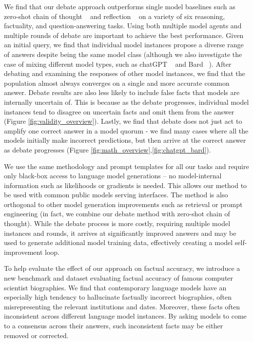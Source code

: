 We find that our debate approach outperforms single model baselines such as zero-shot chain of thought ~\cite{kojima2022large} and reflection ~\cite{reflexion,madaan2023self} on a variety of six reasoning, factuality, and question-answering tasks. Using both multiple model agents and multiple rounds of debate are important to achieve the best performance. Given an initial query, we find that individual model instances propose a diverse range of answers despite being the same model class (although we also investigate the case of mixing different model types, such as chatGPT ~\cite{chatgpt2022} and Bard ~\cite{Pichai_2023}). After debating and examining the responses of other model instances, we find that the population almost always converges on a single and more accurate common answer. Debate results are also less likely to include false facts that models are internally uncertain of. This is because as the debate progresses, individual model instances tend to disagree on uncertain facts and omit them from the answer (Figure \ref{fig:validity_overview}). Lastly, we find that debate does not just act to amplify one correct answer in a model quorum - we find many cases where all the models initially make incorrect predictions, but then arrive at the correct answer as debate progresses (Figure \ref{fig:math_overview},\ref{fig:chatgpt_bard}).

We use the same methodology and prompt templates for all our tasks and require only black-box access to language model generations -- no model-internal information such as likelihoods or gradients is needed. This allows our method to be used with common public models serving interfaces. The method is also orthogonal to other model generation improvements such as retrieval or prompt engineering (in fact, we combine our debate method with zero-shot chain of thought). While the debate process is more costly, requiring multiple model instances and rounds, it arrives at significantly improved answers and may be used to generate additional model training data, effectively creating a model self-improvement loop.

To help evaluate the effect of our approach on factual accuracy, we introduce a new benchmark and dataset evaluating factual accuracy of famous computer scientist biographies. We find that contemporary language models have an especially high tendency to hallucinate factually incorrect biographies, often misrepresenting the relevant institutions and dates. Moreover, these facts often inconsistent across different language model instances. By asking models to come to a consensus across their answers, such inconsistent facts may be either removed or corrected.




